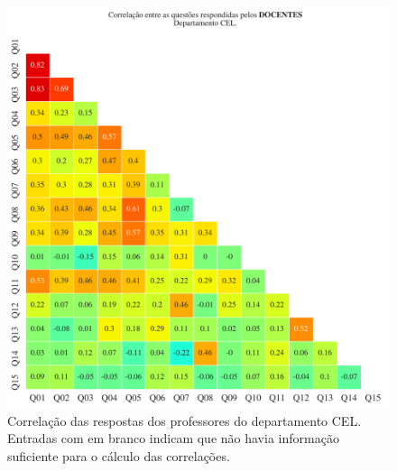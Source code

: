 \documentclass[a4paper,10pt]{article}
\begin{document}
\begin{figure}[h]
\centering
\includegraphics[width=0.999\linewidth]{matriz_corr__CEL_docentes.png}
\caption{\label{fig:corr_docentes}Correlação das respostas dos professores do departamento CEL. Entradas com em branco indicam que não havia informação suficiente para o cálculo das correlações.}
\end{figure}
\end{document}
